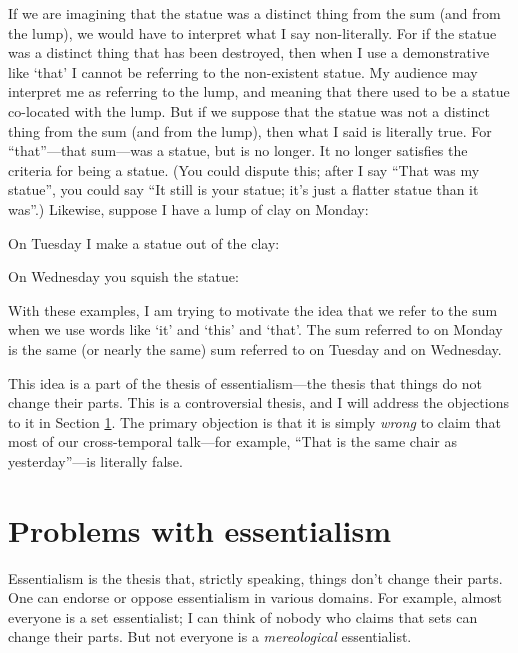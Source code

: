 \documentclass[11pt]{article}
\begin{document}
\begin{spacing}{1.5}
\begin{enumerate}
    If we are imagining that the statue was a distinct thing from the
    sum (and from the lump), we would have to interpret what I say
    non-literally.  For if the statue was a distinct thing that has
    been destroyed, then when I use a demonstrative like `that' I
    cannot be referring to the non-existent statue.  My audience may
    interpret me as referring to the lump, and meaning that there used
    to be a statue co-located with the lump.  But if we suppose that
    the statue was not a distinct thing from the sum (and from the
    lump), then what I said is literally true.  For ``that''---that
    sum---was a statue, but is no longer.  It no longer satisfies the
    criteria for being a statue.  (You could dispute this; after I say
    ``That was my statue'', you could say ``It still is your statue;
    it's just a flatter statue than it was''.)  Likewise, suppose I
    have a lump of clay on Monday:


    On Tuesday I make a statue out of the clay:


    On Wednesday you squish the statue:

\end{enumerate}

With these examples, I am trying to motivate the idea that we refer to
the sum when we use words like `it' and `this' and `that'.  The sum
referred to on Monday is the same (or nearly the same) sum referred to
on Tuesday and on Wednesday.

This idea is a part of the thesis of essentialism---the thesis that
things do not change their parts.  This is a controversial thesis, and
I will address the objections to it in Section \ref{essentialism}.
The primary objection is that it is simply {\em wrong} to claim that
most of our cross-temporal talk---for example, ``That is the same
chair as yesterday''---is literally false.

\section{Problems with essentialism}
\label{essentialism}
Essentialism is the thesis that, strictly speaking, things don't
change their parts.  One can endorse or oppose essentialism in various
domains.  For example, almost everyone is a set essentialist; I can
think of nobody who claims that sets can change their parts.  But not
everyone is a {\em mereological} essentialist.


\end{spacing}
\end{document}
